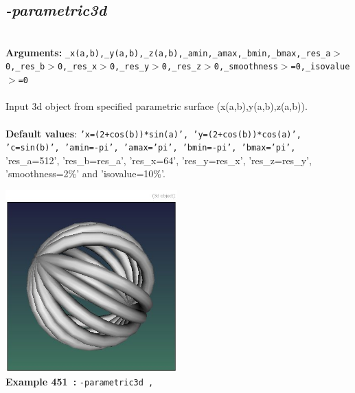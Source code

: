 \documentclass[a4paper,11pt,twoside]{book}
\begin{document}
\subsection{\emph{-parametric3d} }\vspace*{-0.5em}
~\\\textbf{Arguments: } 
{\small \texttt{\_x(a,b),\_y(a,b),\_z(a,b),\_amin,\_amax,\_bmin,\_bmax,\_res\_a$>$0,\_res\_b$>$0,\_res\_x$>$0,\_res\_y$>$0,\_res\_z$>$0,\_smoothness$>$=0,\_isovalue$>$=0}}\\~\\
Input 3d object from specified parametric surface (x(a,b),y(a,b),z(a,b)).
~\\~\\\textbf{Default values}: {\small \texttt{'x=(2+cos(b))*sin(a)', 'y=(2+cos(b))*cos(a)', 'c=sin(b)', 'amin=-pi', 'amax='pi', 'bmin=-pi', 'bmax='pi',}}
~\\'res\_a=512', 'res\_b=res\_a', 'res\_x=64', 'res\_y=res\_x', 'res\_z=res\_y', 'smoothness=2\%' and 'isovalue=10\%'.
\begin{center}\includegraphics[keepaspectratio=true,height=7cm,width=\textwidth]{img/gmic_def451.jpg}\\
{\footnotesize \textbf{Example 451~:} \texttt{-parametric3d ,}}
\end{center}
\end{document}
